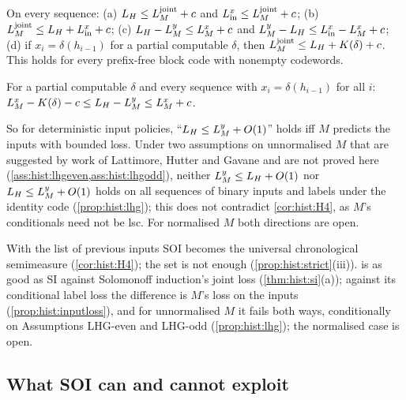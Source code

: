 \begin{theorem}\label{thm:hist:si}
On every sequence: (a) $L_{H}\le L_{M}^{\mathrm{joint}}+c$ and $L^x_{\rm in}\le L_{M}^{\mathrm{joint}}+c$; (b) $L_{M}^{\mathrm{joint}}\le L_{H}+L^x_{\rm in}+c$; (c) $L_{H}-L_{M}^{y}\le L_{M}^{x}+c$ and $L_{M}^{y}-L_{H}\le L^x_{\rm in}-L_{M}^{x}+c$; (d) if $x_i=\delta(h_{i-1})$ for a partial computable $\delta$, then $L_{M}^{\mathrm{joint}}\le L_{H}+K(\delta)+c$. This holds for every prefix-free block code with nonempty codewords.
\end{theorem}

\begin{proposition}\label{prop:hist:inputloss}
For a partial computable $\delta$ and every sequence with $x_i=\delta(h_{i-1})$ for all $i$: $L_{M}^{x}-K(\delta)-c\le L_{H}-L_{M}^{y}\le L_{M}^{x}+c$.
\end{proposition}

So for deterministic input policies, ``$L_{H}\le L_{M}^{y}+O(1)$'' holds iff $M$ predicts the inputs with bounded loss. Under two assumptions on unnormalised $M$ that are suggested by work of Lattimore, Hutter and Gavane \citep{lattimore2011universal} and are not proved here (\cref{ass:hist:lhgeven,ass:hist:lhgodd}), neither $L_{M}^{y}\le L_{H}+O(1)$ nor $L_{H}\le L_{M}^{y}+O(1)$ holds on all sequences of binary inputs and labels under the identity code (\cref{prop:hist:lhg}); this does not contradict \cref{cor:hist:H4}, as $M$'s conditionals need not be lsc. For normalised $M$ both directions are open.

\begin{remark}\label{rem:hist:H4verdict}
With the list of previous inputs SOI becomes the universal chronological semimeasure (\cref{cor:hist:H4}); the set is not enough (\cref{prop:hist:strict}(iii)). \SFIhist{} is as good as SI against Solomonoff induction's joint loss (\cref{thm:hist:si}(a)); against its conditional label loss the difference is $M$'s loss on the inputs (\cref{prop:hist:inputloss}), and for unnormalised $M$ it fails both ways, conditionally on Assumptions LHG-even and LHG-odd (\cref{prop:hist:lhg}); the normalised case is open.
\end{remark}

\subsection{What SOI can and cannot exploit}\label{sec:hist:exploit}

